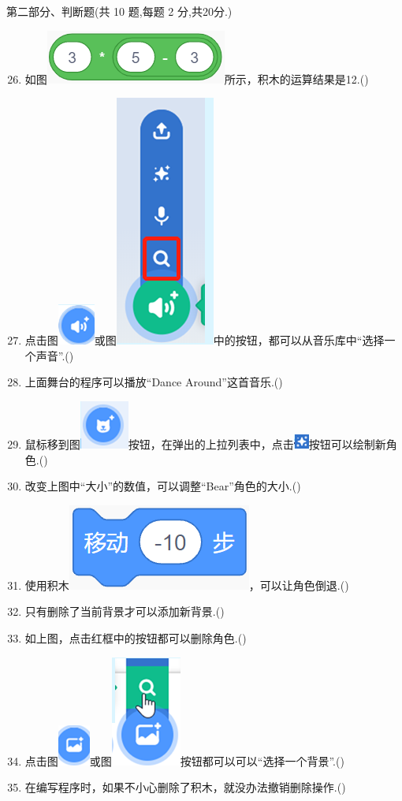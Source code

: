 \documentclass[10pt, a4paper]{article}
\begin{document}
    {\noindent\heiti 第二部分、判断题(共 10 题,每题 2 分,共20分.)}
    \begin{enumerate}
        \setcounter{enumi}{25}
        \item 如图\includegraphics[width=.12\textwidth]{26.png}所示，积木的运算结果是12.(\qquad)

        \item 点击图\includegraphics[width=.02\textwidth]{27-1.png}或图\includegraphics[width=.04\textwidth]{27-2.png}中的按钮，都可以从音乐库中“选择一个声音”.(\qquad)
        
        \item 上面舞台的程序可以播放“Dance Around”这首音乐.(\qquad)
  
        \item 鼠标移到图\includegraphics[width=.03\textwidth]{29-1.png}按钮，在弹出的上拉列表中，点击\includegraphics[width=.025\textwidth]{29-2.png}按钮可以绘制新角色.(\qquad)
        
        \item 改变上图中“大小”的数值，可以调整“Bear”角色的大小.(\qquad)

        \item 使用积木\includegraphics[width=.08\textwidth]{31.png}，可以让角色倒退.(\qquad)
        
        \item 只有删除了当前背景才可以添加新背景.(\qquad)
        
         \item 如上图，点击红框中的按钮都可以删除角色.(\qquad)
        
         \item 点击图\includegraphics[width=.03\textwidth]{34-1.png}或图\includegraphics[width=.03\textwidth]{34-2.png}按钮都可以可以“选择一个背景”.(\qquad)
         
         \item 在编写程序时，如果不小心删除了积木，就没办法撤销删除操作.(\qquad)
    \end{enumerate}
\end{document}
